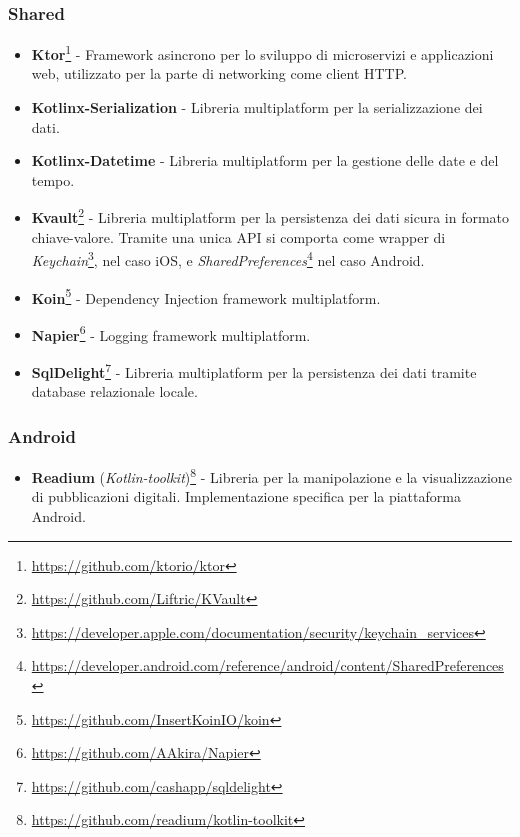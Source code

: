 \subsubsection*{Shared}
\begin{itemize} 
    \item \textbf{Ktor}\footnote{\href{https://github.com/ktorio/ktor}{https://github.com/ktorio/ktor}} - Framework asincrono per lo sviluppo di microservizi e applicazioni web, utilizzato per la parte di networking come client HTTP.
    \item \textbf{Kotlinx-Serialization} - Libreria multiplatform per la serializzazione dei dati.
    \item \textbf{Kotlinx-Datetime} - Libreria multiplatform per la gestione delle date e del tempo.
    \item \textbf{Kvault}\footnote{\href{https://github.com/Liftric/KVault}{https://github.com/Liftric/KVault}} - Libreria multiplatform per la persistenza dei dati sicura in formato chiave-valore. Tramite una unica API si comporta come wrapper di \textit{Keychain}\footnote{\href{https://developer.apple.com/documentation/security/keychain\_services}{https://developer.apple.com/documentation/security/keychain\_services}}, nel caso iOS, e \textit{SharedPreferences}\footnote{\href{https://developer.android.com/reference/android/content/SharedPreferences}{https://developer.android.com/reference/android/content/SharedPreferences}} nel caso Android.
    \item \textbf{Koin}\footnote{\href{https://github.com/InsertKoinIO/koin}{https://github.com/InsertKoinIO/koin}} - Dependency Injection framework multiplatform.
    \item \textbf{Napier}\footnote{\href{https://github.com/AAkira/Napier}{https://github.com/AAkira/Napier}} - Logging framework multiplatform.
    \item \textbf{SqlDelight}\footnote{\href{https://github.com/cashapp/sqldelight}{https://github.com/cashapp/sqldelight}} - Libreria multiplatform per la persistenza dei dati tramite database relazionale locale.
\end{itemize}

\subsubsection*{Android}
\begin{itemize}
    \item \textbf{Readium} (\textit{Kotlin-toolkit})\footnote{\href{https://github.com/readium/kotlin-toolkit}{https://github.com/readium/kotlin-toolkit}} - Libreria per la manipolazione e la visualizzazione di pubblicazioni digitali. Implementazione specifica per la piattaforma Android. 
\end{itemize}

